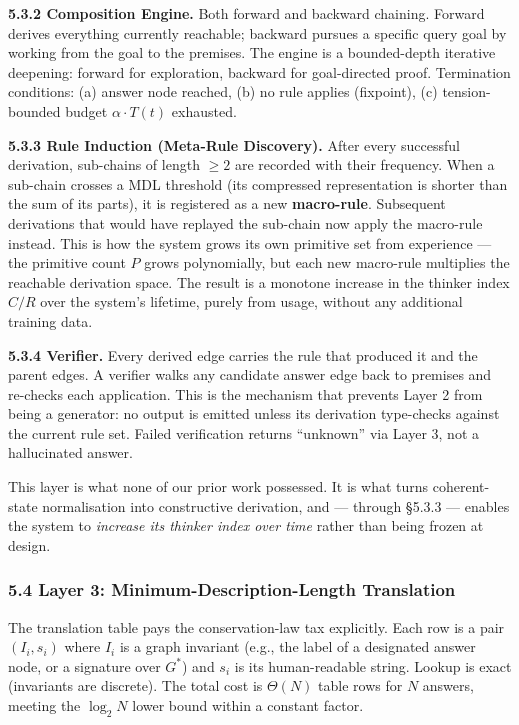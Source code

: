 \documentclass[
  11pt,
  a4paper,
]{article}
\begin{document}
\textbf{5.3.2 Composition Engine.} Both forward and backward chaining.
Forward derives everything currently reachable; backward pursues a
specific query goal by working from the goal to the premises. The engine
is a bounded-depth iterative deepening: forward for exploration,
backward for goal-directed proof. Termination conditions: (a) answer
node reached, (b) no rule applies (fixpoint), (c) tension-bounded budget
\(\alpha \cdot T(t)\) exhausted.

\textbf{5.3.3 Rule Induction (Meta-Rule Discovery).} After every
successful derivation, sub-chains of length \(\geq 2\) are recorded with
their frequency. When a sub-chain crosses a MDL threshold (its
compressed representation is shorter than the sum of its parts), it is
registered as a new \textbf{macro-rule}. Subsequent derivations that
would have replayed the sub-chain now apply the macro-rule instead. This
is how the system grows its own primitive set from experience --- the
primitive count \(P\) grows polynomially, but each new macro-rule
multiplies the reachable derivation space. The result is a monotone
increase in the thinker index \(C/R\) over the system's lifetime, purely
from usage, without any additional training data.

\textbf{5.3.4 Verifier.} Every derived edge carries the rule that
produced it and the parent edges. A verifier walks any candidate answer
edge back to premises and re-checks each application. This is the
mechanism that prevents Layer 2 from being a generator: no output is
emitted unless its derivation type-checks against the current rule set.
Failed verification returns ``unknown'' via Layer 3, not a hallucinated
answer.

This layer is what none of our prior work possessed. It is what turns
coherent-state normalisation into constructive derivation, and ---
through §5.3.3 --- enables the system to \emph{increase its thinker
index over time} rather than being frozen at design.

\subsubsection{5.4 Layer 3: Minimum-Description-Length
Translation}\label{layer-3-minimum-description-length-translation}

The translation table pays the conservation-law tax explicitly. Each row
is a pair \((I_i, s_i)\) where \(I_i\) is a graph invariant (e.g., the
label of a designated answer node, or a signature over \(G^*\)) and
\(s_i\) is its human-readable string. Lookup is exact (invariants are
discrete). The total cost is \(\Theta(N)\) table rows for \(N\) answers,
meeting the \(\log_2 N\) lower bound within a constant factor.
\end{document}
